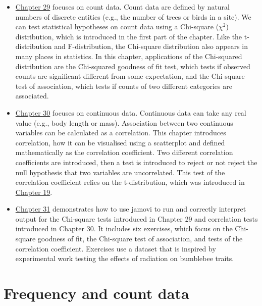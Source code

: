 \documentclass[
  openany]{scrbook}
\begin{document}
\begin{itemize}
\item
  \protect\hyperlink{Chapter_29}{Chapter 29} focuses on count data.
  Count data are defined by natural numbers of discrete entities (e.g., the number of trees or birds in a site).
  We can test statistical hypotheses on count data using a Chi-square (\(\chi^{2}\)) distribution, which is introduced in the first part of the chapter.
  Like the t-distribution and F-distribution, the Chi-square distribution also appears in many places in statistics.
  In this chapter, applications of the Chi-squared distribution are the Chi-squared goodness of fit test, which tests if observed counts are significant different from some expectation, and the Chi-square test of association, which tests if counts of two different categories are associated.
\item
  \protect\hyperlink{Chapter_30}{Chapter 30} focuses on continuous data.
  Continuous data can take any real value (e.g., body length or mass).
  Association between two continuous variables can be calculated as a correlation.
  This chapter introduces correlation, how it can be visualised using a scatterplot and defined mathematically as the correlation coefficient.
  Two different correlation coefficients are introduced, then a test is introduced to reject or not reject the null hypothesis that two variables are uncorrelated.
  This test of the correlation coefficient relies on the t-distribution, which was introduced in \protect\hyperlink{Chapter_19}{Chapter 19}.
\item
  \protect\hyperlink{Chapter_31}{Chapter 31} demonstrates how to use jamovi to run and correctly interpret output for the Chi-square tests introduced in Chapter 29 and correlation tests introduced in Chapter 30.
  It includes six exercises, which focus on the Chi-square goodness of fit, the Chi-square test of association, and tests of the correlation coefficient.
  Exercises use a dataset that is inspired by experimental work testing the effects of radiation on bumblebee traits.
\end{itemize}

\hypertarget{Chapter_29}{%
\chapter{Frequency and count data}\label{Chapter_29}}
\end{document}
